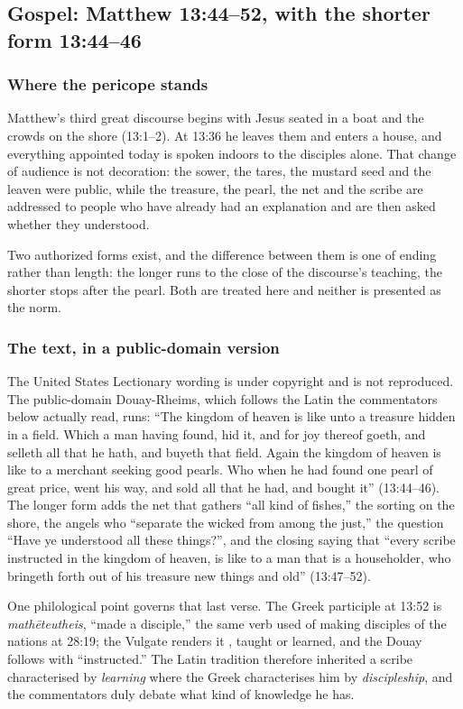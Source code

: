 \subsection*{Gospel: Matthew 13:44--52, with the shorter form 13:44--46}

\subsubsection*{Where the pericope stands}

Matthew's third great discourse begins with Jesus seated in a boat and the crowds on the shore (13:1--2). At 13:36 he leaves them and enters a house, and everything appointed today is spoken indoors to the disciples alone. That change of audience is not decoration: the sower, the tares, the mustard seed and the leaven were public, while the treasure, the pearl, the net and the scribe are addressed to people who have already had an explanation and are then asked whether they understood.

Two authorized forms exist, and the difference between them is one of ending rather than length: the longer runs to the close of the discourse's teaching, the shorter stops after the pearl. Both are treated here and neither is presented as the norm.

\subsubsection*{The text, in a public-domain version}

The United States Lectionary wording is under copyright and is not reproduced. The public-domain Douay-Rheims, which follows the Latin the commentators below actually read, runs: ``The kingdom of heaven is like unto a treasure hidden in a field. Which a man having found, hid it, and for joy thereof goeth, and selleth all that he hath, and buyeth that field. Again the kingdom of heaven is like to a merchant seeking good pearls. Who when he had found one pearl of great price, went his way, and sold all that he had, and bought it'' (13:44--46). The longer form adds the net that gathers ``all kind of fishes,'' the sorting on the shore, the angels who ``separate the wicked from among the just,'' the question ``Have ye understood all these things?'', and the closing saying that ``every scribe instructed in the kingdom of heaven, is like to a man that is a householder, who bringeth forth out of his treasure new things and old'' (13:47--52).

One philological point governs that last verse. The Greek participle at 13:52 is \emph{math\=eteutheis}, ``made a disciple,'' the same verb used of making disciples of the nations at 28:19; the Vulgate renders it , taught or learned, and the Douay follows with ``instructed.'' The Latin tradition therefore inherited a scribe characterised by \emph{learning} where the Greek characterises him by \emph{discipleship}, and the commentators duly debate what kind of knowledge he has.

